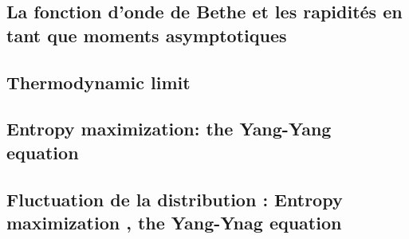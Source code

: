 \subsection{La fonction d'onde de Bethe et les rapidités en tant que moments asymptotiques}


\subsection{Thermodynamic limit}


\subsection{Entropy maximization: the Yang-Yang equation}


%

\subsection{Fluctuation de la distribution : Entropy maximization , the  Yang-Ynag equation}







